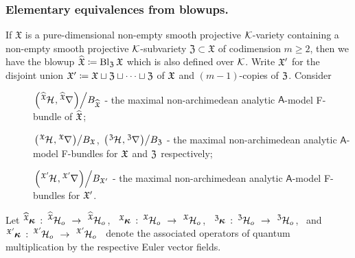 \documentclass[twoside,leqno]{article}
\numberwithin{equation}{section}
\theoremstyle{plain}
\theoremstyle{definition}
\begin{document}
\subsubsection{Elementary equivalences from blowups.} \label{sssec:eqblowupGatoms}
If $\mathfrak{X}$ is a pure-dimensional non-empty smooth projective $\mathcal K$-variety containing a  non-empty smooth projective $\mathcal K$-subvariety $\mathfrak{Z}\subset \mathfrak{X}$ of codimension $m\ge 2$, then we have the blowup $\widehat{\mathfrak{X}} \coloneqq \operatorname{Bl}_{\mathfrak{Z}} \mathfrak{X}$ which is also defined over $\mathcal K$. Write $\mathfrak X'$
for the disjoint union $\mathfrak X' \coloneqq \mathfrak X \sqcup \mathfrak Z \sqcup \cdots \sqcup \mathfrak Z$ of $\mathfrak X$ and $(m-1)$-copies of $\mathfrak Z$. Consider 

\medskip 

\begin{description}
\item[] {$\left.\left(\tensor[^{\widehat{\fX}}]{\cH}{},\tensor[^{\widehat{\fX}}]{\nabla}{}\right)\right/\!B_{\widehat{\fX}}$} - the maximal non-archimedean analytic $\mathsf{A}$-model  F-bundle of $\widehat{\mathfrak X}$;
    \item[] {$\left.\left(\tensor[^{\fX}]{\cH}{},\tensor[^{\fX}]{\nabla}{}\right)\right/\!  B_{\fX}$, $\left.\left(\tensor[^{\fZ}]{\cH}{},\tensor[^{\fZ}]{\nabla}{}\right)\right/\!B_{\fZ}$} - the maximal non-archimedean analytic $\mathsf{A}$-model  F-bundles for $\mathfrak X$ and $\mathfrak Z$ respectively; 
    \item[] {$\left.\left(\tensor[^{\fX'}]{\cH}{},\tensor[^{\fX'}]{\nabla}{}\right)\right/\! B_{\fX'}$}  - the maximal non-archimedean analytic $\mathsf{A}$-model  F-bundles for $\mathfrak X'$.
\end{description}

\medskip


Let  
$\tensor[^{\widehat{\fX}}]{\bkappa}{} \, : \, \tensor[^{\widehat{\fX}}]{{\cH_{o}}}{} \ \to \ 
\tensor[^{\widehat{\fX}}]{{\cH_{o}}}{}$, \ 
$\tensor[^{\fX}]{\bkappa}{} \, : \, \tensor[^{\fX}]{{\cH_{o}}}{} \ \to \ 
\tensor[^{\fX}]{{\cH_{o}}}{}$, \ 
$\tensor[^{\fZ}]{\bkappa}{} \, : \, \tensor[^{\fZ}]{{\cH_{o}}}{} \ \to \ 
\tensor[^{\fZ}]{{\cH_{o}}}{}$, \ and  
$\tensor[^{\fX'}]{\bkappa}{} \, : \, \tensor[^{\fX'}]{{\cH_{o}}}{} \ \to \ 
\tensor[^{\fX'}]{{\cH_{o}}}{}$
\ denote the associated operators of quantum multiplication by the respective Euler vector fields. 


\medskip 
\end{document}
